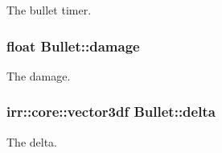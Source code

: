 The bullet timer. 

\hypertarget{class_bullet_a1cad8c80e63d13da57b563b8e8e3f79e}{
\subsubsection[{damage}]{\setlength{\rightskip}{0pt plus 5cm}float Bullet\-::damage\hspace{0.3cm}{\ttfamily [private]}}}\label{class_bullet_a1cad8c80e63d13da57b563b8e8e3f79e}


The damage. 

\hypertarget{class_bullet_ab9e89b541c875e153a8ae09f1527913e}{
\subsubsection[{delta}]{\setlength{\rightskip}{0pt plus 5cm}irr\-::core\-::vector3df Bullet\-::delta\hspace{0.3cm}{\ttfamily [private]}}}\label{class_bullet_ab9e89b541c875e153a8ae09f1527913e}


The delta. 

